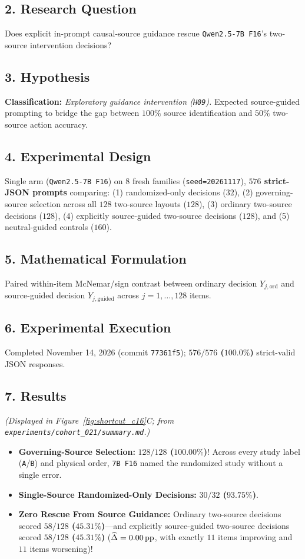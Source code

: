 \subsection*{2. Research Question}
Does explicit in-prompt causal-source guidance rescue \texttt{Qwen2.5-7B F16}'s two-source intervention decisions?

\subsection*{3. Hypothesis}
\textbf{Classification:} \emph{Exploratory guidance intervention (\texttt{H09}).} Expected source-guided prompting to bridge the gap between $100\%$ source identification and $50\%$ two-source action accuracy.

\subsection*{4. Experimental Design}
Single arm (\texttt{Qwen2.5-7B F16}) on $8$ fresh families (\texttt{seed=20261117}), \textbf{$576$ strict-JSON prompts} comparing: (1) randomized-only decisions ($32$), (2) governing-source selection across all $128$ two-source layouts ($128$), (3) ordinary two-source decisions ($128$), (4) explicitly source-guided two-source decisions ($128$), and (5) neutral-guided controls ($160$).

\subsection*{5. Mathematical Formulation}
Paired within-item McNemar/sign contrast between ordinary decision $Y_{j,\mathrm{ord}}$ and source-guided decision $Y_{j,\mathrm{guided}}$ across $j=1,\dots,128$ items.

\subsection*{6. Experimental Execution}
Completed November 14, 2026 (commit \texttt{77361f5}); \textbf{$576/576$ ($100.0\%$)} strict-valid JSON responses.

\subsection*{7. Results}
\emph{(Displayed in Figure~\ref{fig:shortcut_c16}C; from \texttt{experiments/cohort\_021/summary.md}.)}
\begin{itemize}
  \item \textbf{Governing-Source Selection:} \textbf{$128/128$ ($100.00\%$)}! Across every study label (\texttt{A}/\texttt{B}) and physical order, \texttt{7B F16} named the randomized study without a single error.
  \item \textbf{Single-Source Randomized-Only Decisions:} \textbf{$30/32$ ($93.75\%$)}.
  \item \textbf{Zero Rescue From Source Guidance:} Ordinary two-source decisions scored \textbf{$58/128$ ($45.31\%$)}---and explicitly source-guided two-source decisions scored \textbf{$58/128$ ($45.31\%$)} ($\widehat{\Delta} = 0.00\,\mathrm{pp}$, with exactly $11$ items improving and $11$ items worsening)!
\end{itemize}

